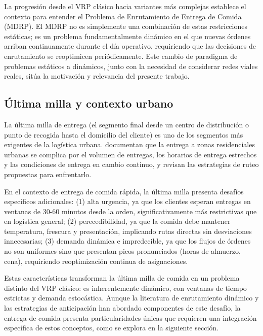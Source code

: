 \documentclass[12pt,letterpaper,oneside]{book}
\begin{document}
La progresión desde el VRP clásico hacia variantes más complejas establece el contexto para entender el 
Problema de Enrutamiento de Entrega de Comida (MDRP). El MDRP no es simplemente una combinación de estas 
restricciones estáticas; es un problema fundamentalmente dinámico en el que nuevas órdenes arriban 
continuamente durante el día operativo, requiriendo que las decisiones de enrutamiento se reoptimicen periódicamente. 
Este cambio de paradigma de problemas estáticos a dinámicos, junto con la necesidad de considerar redes viales 
reales, sitúa la motivación y relevancia del presente trabajo.


\subsection{Última milla y contexto urbano} %

La última milla de entrega (el segmento final desde un centro de distribución o 
punto de recogida hasta el domicilio del cliente) es uno de los segmentos más
exigentes de la logística urbana. \citet{Jazemi2023} documentan
que la entrega a zonas residenciales urbanas se complica por el volumen de entregas,
los horarios de entrega estrechos y las condiciones de entrega en cambio continuo, y
revisan las estrategias de ruteo propuestas para enfrentarlo.

En el contexto de entrega de comida rápida, la última milla presenta desafíos 
específicos adicionales: (1) alta urgencia, ya que los clientes esperan entregas 
en ventanas de 30-60 minutos desde la orden, significativamente más restrictivas 
que en logística general; (2) perecedibilidad, ya que la comida debe mantener 
temperatura, frescura y presentación, implicando rutas directas sin desviaciones 
innecesarias; (3) demanda dinámica e impredecible, ya que los flujos de órdenes no son 
uniformes sino que presentan picos pronunciados (horas de almuerzo, cena), 
requiriendo reoptimización continua de asignaciones.

Estas características transforman la última milla de comida en un problema 
distinto del VRP clásico: es inherentemente dinámico, con ventanas de tiempo 
estrictas y demanda estocástica. Aunque la literatura de enrutamiento dinámico 
\cite{Psaraftis1980, Cordeau2007} y las estrategias de anticipación 
\cite{Ichoua2006DDARP} han abordado componentes de este desafío, la entrega de 
comida presenta particularidades únicas que requieren una integración específica 
de estos conceptos, como se explora en la siguiente sección.
\end{document}
